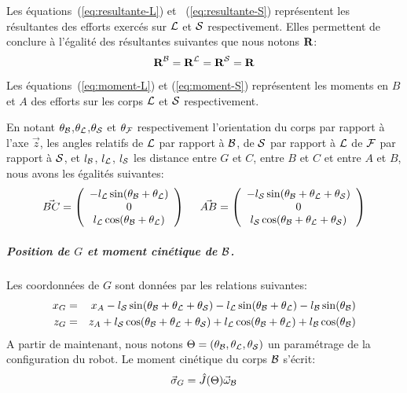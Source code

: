 Les équations~(\ref{eq:resultante-L}) et ~(\ref{eq:resultante-S})
représentent les résultantes des efforts exercés sur ${\cal L}$ et
${\cal S}$ respectivement. Elles permettent de conclure à l'égalité
des résultantes suivantes que nous notons $\textbf{R}$:
$$
\textbf{R}^{\cal B} = \textbf{R}^{\cal L} = \textbf{R}^{\cal S} = \textbf{R}
$$
Les équations~(\ref{eq:moment-L}) et
(\ref{eq:moment-S}) représentent les moments en $B$ et $A$ des efforts
sur les corps ${\cal L}$ et ${\cal S}$ respectivement.

En notant $\theta_{\cal B}$,$\theta_{\cal L}$,$\theta_{\cal S}$ et
$\theta_{\cal F}$ respectivement l'orientation du corps par rapport à
l'axe $\vec{z}$, les angles relatifs de ${\cal L}$ par rapport à ${\cal B}$, de
${\cal S}$ par rapport à ${\cal L}$ de ${\cal F}$ par rapport à ${\cal
  S}$, et $l_{\cal B}$, $l_{\cal L}$, $l_{\cal S}$ les distance entre
$G$ et $C$, entre $B$ et $C$ et entre $A$ et $B$, nous avons les égalités suivantes:
$$
\vec{BC} =
\left(\begin{array}{c}
-l_{\cal L} \sin(\theta_{\cal B}+\theta_{\cal L}) \\
0\\
l_{\cal L} \cos(\theta_{\cal B}+\theta_{\cal L})
\end{array}\right)
\ \ \ \
\vec{AB} =
\left(\begin{array}{c}
-l_{\cal S} \sin(\theta_{\cal B}+\theta_{\cal L}+\theta_{\cal S}) \\
0\\
l_{\cal S} \cos(\theta_{\cal B}+\theta_{\cal L}+\theta_{\cal S})
\end{array}\right)
$$
\subparagraph{Position de $G$ et moment cinétique de ${\cal B}$.}
Les coordonnées de $G$ sont données par les relations suivantes:
\begin{eqnarray}
  \label{eq:xG}
  x_G &=& x_A -l_{\cal S} \sin(\theta_{\cal B}+\theta_{\cal
    L}+\theta_{\cal S}) -l_{\cal L} \sin(\theta_{\cal B}+\theta_{\cal
    L}) -l_{\cal B} \sin(\theta_{\cal B}) \\
  \label{eq:zG}
  z_G &=& z_A + l_{\cal S} \cos(\theta_{\cal B}+\theta_{\cal
    L}+\theta_{\cal S}) + l_{\cal L} \cos(\theta_{\cal B}+\theta_{\cal
    L}) + l_{\cal B} \cos(\theta_{\cal B})
\end{eqnarray}
A partir de maintenant, nous notons $\Theta = (\theta_{\cal B},
\theta_{\cal L}, \theta_{\cal S})$ un paramétrage de la configuration
du robot. Le moment cinétique du corps ${\cal B}$ s'écrit:
\begin{equation}\label{eq:sigma-G}
\vec{\sigma}_G = \hat{J}(\Theta) \vec{\omega}_{\cal B}
\end{equation}
